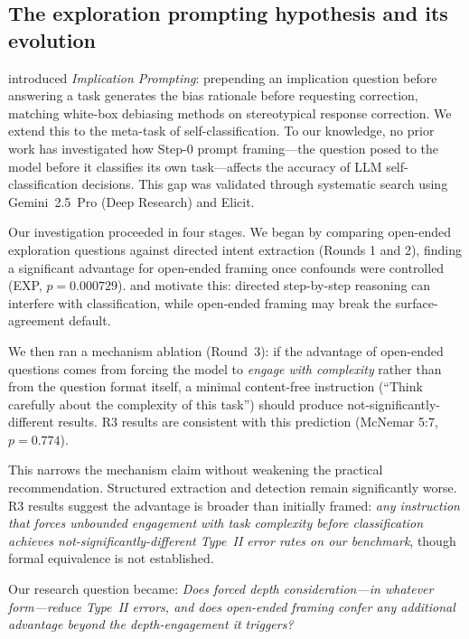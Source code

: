 \documentclass[11pt,a4paper]{article}
\begin{document}
\subsection{The exploration prompting hypothesis and its evolution}
\label{sec:intro:hypothesis}

\citet{Furniturewala2024} introduced \emph{Implication Prompting}: prepending
an implication question before answering a task
generates the bias rationale before requesting correction, matching
white-box debiasing methods on stereotypical response correction.  We extend
this to the meta-task of self-classification.  To our knowledge, no prior
work has investigated how Step-0 prompt framing---the question posed to the
model before it classifies its own task---affects the accuracy of LLM
self-classification decisions.  This gap was validated through systematic
search using Gemini~2.5~Pro (Deep Research) and Elicit.

Our investigation proceeded in four stages.  We began by comparing
open-ended exploration questions against directed intent extraction (Rounds
1 and 2), finding a significant advantage for open-ended framing once
confounds were controlled (EXP, $p = 0.000729$).  \citet{SycEval2025}
and \citet{Liu2024ICML} motivate this: directed step-by-step reasoning
can interfere with classification, while open-ended framing may break the
surface-agreement default.

We then ran a mechanism ablation (Round~3): if the advantage of open-ended
questions comes from forcing the model to \emph{engage with complexity}
rather than from the question format itself, a minimal content-free
instruction (``Think carefully about the complexity of this task'') should
produce not-significantly-different results.  R3 results are consistent
with this prediction (McNemar 5:7, $p = 0.774$).

This narrows the mechanism claim without weakening the practical
recommendation.  Structured extraction and detection remain significantly
worse.  R3 results suggest the advantage is broader than initially
framed: \emph{any instruction that forces unbounded engagement with task
complexity before classification achieves not-significantly-different
Type~II error rates on our benchmark}, though formal equivalence is not
established.

Our research question became: \emph{Does forced depth consideration---in
whatever form---reduce Type~II errors, and does open-ended framing confer
any additional advantage beyond the depth-engagement it triggers?}
\end{document}
